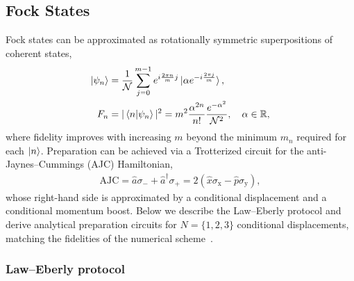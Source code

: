 \documentclass[aps,prx,showpacs,notitlepage,twocolumn,superscriptaddress,nofootinbib,preprintnumbers,floatfix,10pt, longbibliography]{revtex4-2}
\begin{document}
{\subsection{Fock States}\label{app:fock-states}

Fock states can be approximated as rotationally symmetric superpositions of
coherent states,
\begin{align}
  \ket{\psi_n} &= \frac{1}{\mathcal{N}}\sum_{j=0}^{m-1}
    e^{i\frac{2\pi n}{m}j}\ket{\alpha e^{-i\frac{2\pi j}{m}}},
    \label{eq:fock}\\
  F_n &= |\braket{n|\psi_n}|^2
       = m^2\frac{\alpha^{2n}}{n!}\frac{e^{-\alpha^2}}{\mathcal{N}^2},
    \quad\alpha\in\mathbb{R},
    \label{eq:prob_fock}
\end{align}
where fidelity improves with increasing $m$ beyond the minimum $m_n$
required for each $\ket{n}$.  Preparation can be achieved via a
Trotterized circuit for the anti-Jaynes--Cummings (AJC) Hamiltonian,
\begin{align}
  \mathrm{AJC} = \hat{a}\sigma_- + \hat{a}^\dagger\sigma_+
               = 2(\hat{x}\sigma_\mathrm{x}-\hat{p}\sigma_\mathrm{y}),
\end{align}
whose right-hand side is approximated by a conditional displacement and a
conditional momentum boost.  Below we describe the Law--Eberly protocol
and derive analytical preparation circuits for $N=\{1,2,3\}$ conditional
displacements, matching the fidelities of the numerical
scheme~\cite{eickbusch2022fast}.

\subsubsection{Law--Eberly protocol}\label{app:law-eberly}

}
\end{document}
